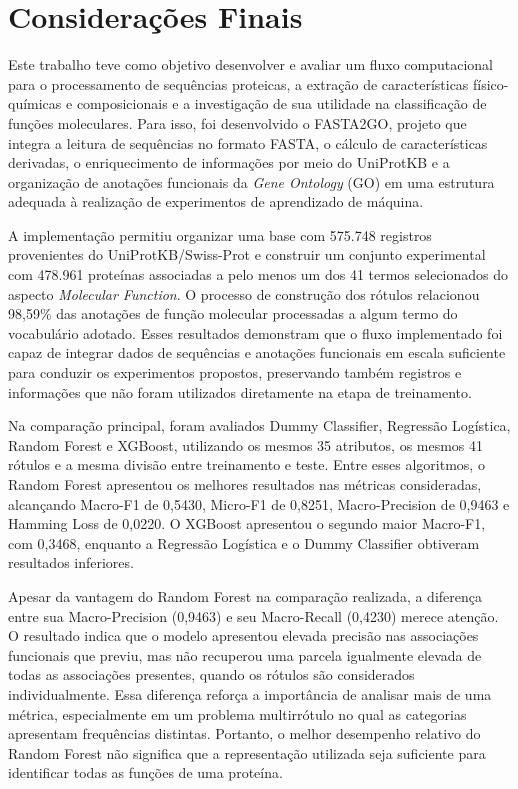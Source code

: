 
\section{Considerações Finais}
\label{sec:consideracoes}

Este trabalho teve como objetivo desenvolver e avaliar um fluxo computacional para o processamento de sequências proteicas, a extração de características físico-químicas e composicionais e a investigação de sua utilidade na classificação de funções moleculares. Para isso, foi desenvolvido o FASTA2GO, projeto que integra a leitura de sequências no formato FASTA, o cálculo de características derivadas, o enriquecimento de informações por meio do UniProtKB e a organização de anotações funcionais da \textit{Gene Ontology} (GO) em uma estrutura adequada à realização de experimentos de aprendizado de máquina.

A implementação permitiu organizar uma base com 575.748 registros provenientes do UniProtKB/Swiss-Prot e construir um conjunto experimental com 478.961 proteínas associadas a pelo menos um dos 41 termos selecionados do aspecto \textit{Molecular Function}. O processo de construção dos rótulos relacionou 98,59\% das anotações de função molecular processadas a algum termo do vocabulário adotado. Esses resultados demonstram que o fluxo implementado foi capaz de integrar dados de sequências e anotações funcionais em escala suficiente para conduzir os experimentos propostos, preservando também registros e informações que não foram utilizados diretamente na etapa de treinamento.

Na comparação principal, foram avaliados Dummy Classifier, Regressão Logística, Random Forest e XGBoost, utilizando os mesmos 35 atributos, os mesmos 41 rótulos e a mesma divisão entre treinamento e teste. Entre esses algoritmos, o Random Forest apresentou os melhores resultados nas métricas consideradas, alcançando Macro-F1 de 0,5430, Micro-F1 de 0,8251, Macro-Precision de 0,9463 e Hamming Loss de 0,0220. O XGBoost apresentou o segundo maior Macro-F1, com 0,3468, enquanto a Regressão Logística e o Dummy Classifier obtiveram resultados inferiores.

Apesar da vantagem do Random Forest na comparação realizada, a diferença entre sua Macro-Precision (0,9463) e seu Macro-Recall (0,4230) merece atenção. O resultado indica que o modelo apresentou elevada precisão nas associações funcionais que previu, mas não recuperou uma parcela igualmente elevada de todas as associações presentes, quando os rótulos são considerados individualmente. Essa diferença reforça a importância de analisar mais de uma métrica, especialmente em um problema multirrótulo no qual as categorias apresentam frequências distintas. Portanto, o melhor desempenho relativo do Random Forest não significa que a representação utilizada seja suficiente para identificar todas as funções de uma proteína.

